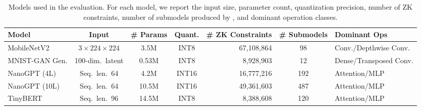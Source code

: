 \begin{table}[t]
\centering
\small
\setlength{\tabcolsep}{5pt}
\renewcommand{\arraystretch}{1.15}
\begin{tabular}{l c c c r c l}
\toprule
\textbf{Model} &
\textbf{Input} &
\textbf{\# Params} &
\textbf{Quant.} &
\textbf{\# ZK Constraints} &
\textbf{\# Submodels} &
\textbf{Dominant Ops} \\
\midrule

MobileNetV2
  & $3 \times 224 \times 224$
  & 3.5M
  & INT8
  & 67,108,864
  & 98
  & Conv./Depthwise Conv. \\

MNIST-GAN Gen.
  & 100-dim.\ latent
  & 0.53M
  & INT8
  & 8,928,903
  & 12
  & Dense/Transposed Conv. \\

NanoGPT (4L)
  & Seq.\ len.\ 64
  & 4.2M
  & INT16
  & 16,777,216
  & 192
  & Attention/MLP \\

NanoGPT (10L)
  & Seq.\ len.\ 64
  & 10.5M
  & INT16
  & 49,361,603
  & 487
  & Attention/MLP \\

TinyBERT
  & Seq.\ len.\ 96
  & 14.5M
  & INT8
  & 8,388,608
  & 120
  & Attention/MLP \\

\bottomrule
\end{tabular}
\caption{
Models used in the evaluation. For each model, we report the input size, parameter count, quantization precision, number of ZK constraints, number of submodels produced by \TITLE{}, and dominant operation classes.
}
\label{tab:models}
\end{table}





